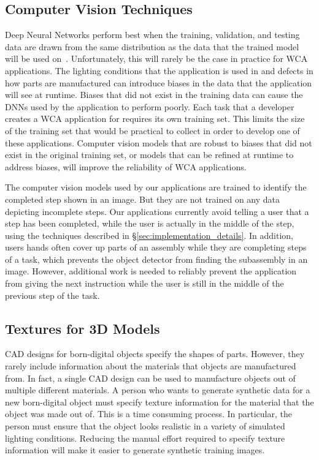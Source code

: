 \subsection{Computer Vision Techniques}

Deep Neural Networks perform best when the training, validation, and testing
data are drawn from the same distribution as the data that the trained model
will be used on~\cite{pmlr-v97-recht19a}.
Unfortunately, this will rarely be the case in practice for WCA applications.
The lighting conditions that the application is used in and defects in how parts
are manufactured can introduce biases in the data that the application will see
at runtime.
Biases that did not exist in the training data can cause the DNNs used by the
application to perform poorly.
Each task that a developer creates a WCA application for requires its own
training set.
This limits the size of the training set that would be practical to collect in
order to develop one of these applications.
Computer vision models that are robust to biases that did not exist in the
original training set, or models that can be refined at runtime to address
biases, will improve the reliability of WCA applications.

The computer vision models used by our applications are trained to identify the
completed step shown in an image.
But they are not trained on any data depicting incomplete steps.
Our applications currently avoid telling a user that a step has been completed,
while the user is actually in the middle of the step, using the techniques
described in \S\ref{sec:implementation_details}.
In addition, users hands often cover up parts of an assembly while they
are completing steps of a task, which prevents the object detector from finding
the subassembly in an image.
However, additional work is needed to reliably prevent the application from
giving the next instruction while the user is still in the middle of the
previous step of the task.

\subsection{Textures for 3D Models}

CAD designs for born-digital objects specify the shapes of parts.
However, they rarely include information about the materials that objects are
manufactured from.
In fact, a single CAD design can be used to manufacture objects out of multiple
different materials.
A person who wants to generate synthetic data for a new born-digital object must
specify texture information for the material that the object was made out of.
This is a time consuming process.
In particular, the person must ensure that the object looks realistic in a
variety of simulated lighting conditions.
Reducing the manual effort required to specify texture information will make it
easier to generate synthetic training images.


